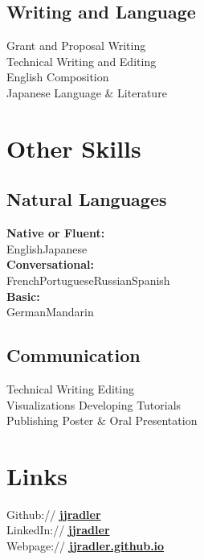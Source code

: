 \documentclass[letterpaper]{radler-resume-class}
\begin{document}
\begin{minipage}[t]{0.32\textwidth}
\sectionspace

\subsection{Writing and Language}
\textbullet{}Grant and Proposal Writing\\
\textbullet{}Technical Writing and Editing\\
\textbullet{}English Composition\\
\textbullet{}Japanese Language \& Literature

\sectionspace


\section{Other Skills}

\sectionspace

\subsection{Natural Languages}
\textbf{Native or Fluent:}\\English\textbullet{}Japanese\\
\textbf{Conversational:} \\French\textbullet{}Portuguese\textbullet{}Russian\textbullet{}Spanish\\
\textbf{Basic:}\\German\textbullet{}Mandarin

\sectionspace

\subsection{Communication}
Technical Writing \textbullet{} Editing\\
\textbullet{}Visualizations \textbullet{} Developing Tutorials\\
\textbullet{}Publishing \textbullet{} Poster \& Oral Presentation

\sectionspace

\section{Links} 
\sectionspace
\textbullet{}Github:// \href{https://github.com/jjradler}{\bf jjradler} \\
\textbullet{}LinkedIn:// \href{https://www.linkedin.com/in/jjradler/}{\bf jjradler} \\
\textbullet{}Webpage:// \href{http://jjradler.github.io}{\bf jjradler.github.io}

\end{minipage} %
\end{document}
